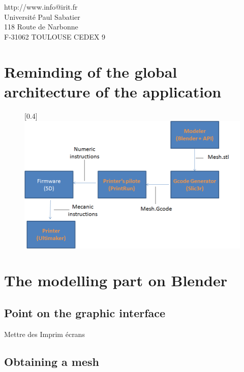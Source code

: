 \documentclass{article}
\begin{document}
\begin{center}
http://www.info@irit.fr\\
Université Paul Sabatier \\
118 Route de Narbonne \\
F-31062 TOULOUSE CEDEX 9
\end{center}

\thispagestyle{empty}

\newpage

\tableofcontents

\newpage

\section{Reminding of the global architecture of the application}


\begin{figure}[!h]
\begin{center}
\scalebox{0.4}[0.4]{\includegraphics{./Images/ARD1}}
\end{center}
\end{figure}

\newpage

\section{The modelling part on Blender}

\subsection{Point on the graphic interface}

Mettre des Imprim écrans

\subsection{Obtaining a mesh}
\end{document}
